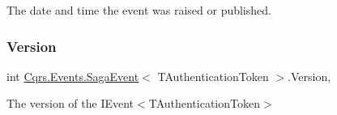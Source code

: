 The date and time the event was raised or published. 

\mbox{\label{classCqrs_1_1Events_1_1SagaEvent_a4918d2e0a66897600143f1e645a0f136_a4918d2e0a66897600143f1e645a0f136}} 
\subsubsection{\texorpdfstring{Version}{Version}}
{\footnotesize\ttfamily int \hyperlink{classCqrs_1_1Events_1_1SagaEvent}{Cqrs.\+Events.\+Saga\+Event}$<$ T\+Authentication\+Token $>$.Version\hspace{0.3cm}{\ttfamily [get]}, {\ttfamily [set]}}



The version of the I\+Event$<$\+T\+Authentication\+Token$>$ 

